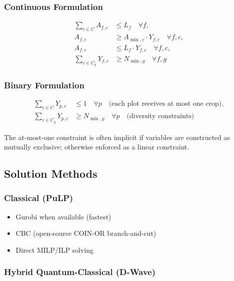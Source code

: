 \documentclass[11pt,a4paper]{article}
\begin{document}
\subsubsection{Continuous Formulation}

\begin{align}
\sum_{c \in C} A_{f,c} &\leq L_f \quad \forall f, \\
A_{f,c} &\geq A_{\min,c} \cdot Y_{f,c} \quad \forall f,c, \\
A_{f,c} &\leq L_f \cdot Y_{f,c} \quad \forall f,c, \\
\sum_{c \in C_g} Y_{f,c} &\geq N_{\min,g} \quad \forall f,g
\end{align}

\subsubsection{Binary Formulation}

\begin{align}
\sum_{c \in C} Y_{p,c} &\leq 1 \quad \forall p \quad \text{(each plot receives at most one crop)}, \\
\sum_{c \in C_g} Y_{p,c} &\geq N_{\min,g} \quad \forall p \quad \text{(diversity constraints)}
\end{align}

The at-most-one constraint is often implicit if variables are constructed as mutually exclusive; otherwise enforced as a linear constraint.

\subsection{Solution Methods}

\subsubsection{Classical (PuLP)}

\begin{itemize}
    \item Gurobi when available (fastest)
    \item CBC (open-source COIN-OR branch-and-cut)
    \item Direct MILP/ILP solving
\end{itemize}

\subsubsection{Hybrid Quantum-Classical (D-Wave)}
\end{document}
